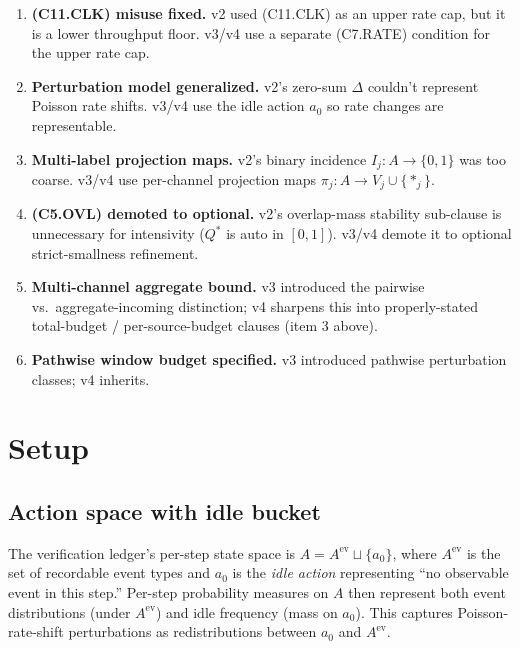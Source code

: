 \documentclass{article}
\begin{document}
\begin{enumerate}
\item \textbf{(C11.CLK) misuse fixed.}  v2 used (C11.CLK) as
  an upper rate cap, but it is a lower throughput floor.  v3/v4
  use a separate (C7.RATE) condition for the upper rate cap.

\item \textbf{Perturbation model generalized.}  v2's zero-sum
  $\Delta$ couldn't represent Poisson rate shifts.  v3/v4 use the
  idle action $a_0$ so rate changes are representable.

\item \textbf{Multi-label projection maps.}  v2's binary
  incidence $I_j: A \to \{0,1\}$ was too coarse.  v3/v4 use
  per-channel projection maps $\pi_j: A \to V_j \cup \{*_j\}$.

\item \textbf{(C5.OVL) demoted to optional.}  v2's
  overlap-mass stability sub-clause is unnecessary for
  intensivity ($Q^*$ is auto in $[0,1]$).  v3/v4 demote it to
  optional strict-smallness refinement.

\item \textbf{Multi-channel aggregate bound.}  v3 introduced the
  pairwise vs.\ aggregate-incoming distinction; v4 sharpens this
  into properly-stated total-budget / per-source-budget clauses
  (item 3 above).

\item \textbf{Pathwise window budget specified.}  v3 introduced
  pathwise perturbation classes; v4 inherits.
\end{enumerate}

\section{Setup}

\subsection{Action space with idle bucket}

The verification ledger's per-step state space is $A = A^{\mathrm{ev}}
\sqcup \{a_0\}$, where $A^{\mathrm{ev}}$ is the set of recordable
event types and $a_0$ is the \emph{idle action} representing
``no observable event in this step.''  Per-step probability measures
on $A$ then represent both event distributions (under
$A^{\mathrm{ev}}$) and idle frequency (mass on $a_0$).  This
captures Poisson-rate-shift perturbations as redistributions
between $a_0$ and $A^{\mathrm{ev}}$.
\end{document}
